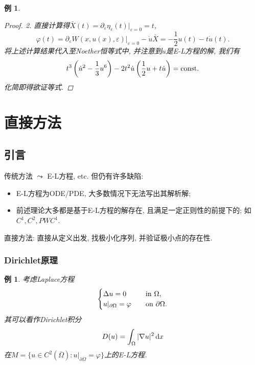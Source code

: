 \documentclass[12pt,a4paper]{article}
\newtheorem{example}[theorem]{例}
\begin{document}
\begin{example}
\begin{proof}
        2. 直接计算得$\bar{X}(t) = \partial_{\varepsilon}\eta_{\varepsilon}(t)|_{\varepsilon = 0} = t$, 
        \begin{equation*}
            \varphi(t) = \partial_{\varepsilon}W(x, u(x), \varepsilon)|_{\varepsilon = 0} - \dot u \bar{X} = -\frac{1}{2}u(t) - t\dot u(t).
        \end{equation*}
        将上述计算结果代入至Noether恒等式中, 并注意到$u$是E-L方程的解, 我们有
        \begin{equation*}
            t^3\left(\dot u^2 - \frac{1}{3}u^6\right) - 2t^2\dot u\left(\frac{1}{2}u + t\dot u\right) = {\rm const}.
        \end{equation*} 
        化简即得欲证等式.
    \end{proof}
\end{example}


\section{直接方法}

\subsection{引言}

传统方法 $\leadsto$ E-L方程, etc. 但仍有许多缺陷:
\begin{itemize}
    \item E-L方程为ODE/PDE, 大多数情况下无法写出其解析解;
    \item 前述理论大多都是基于E-L方程的解存在, 且满足一定正则性的前提下的; 如$C^1, C^2, PWC^1$.
\end{itemize}

直接方法: 直接从定义出发, 找极小化序列, 并验证极小点的存在性.

\subsubsection{Dirichlet原理}

\begin{example}
    考虑Laplace方程
    \begin{equation}\label{33}
        \begin{cases}
            \Delta u = 0 \quad &{\rm in} \ \Omega, \\ 
            u|_{\partial\Omega} = \varphi \quad &{\rm on}\ \partial\Omega.
        \end{cases}
    \end{equation}
    其可以看作Dirichlet积分
    \begin{equation}\label{34}
        D(u) = \int_{\Omega}|\nabla u|^2 \,{\rm d}x
    \end{equation}
    在$M = \{u \in C^2(\overline{\Omega})\colon u|_{\partial\Omega} = \varphi\}$上的E-L方程.
\end{example}
\end{document}
